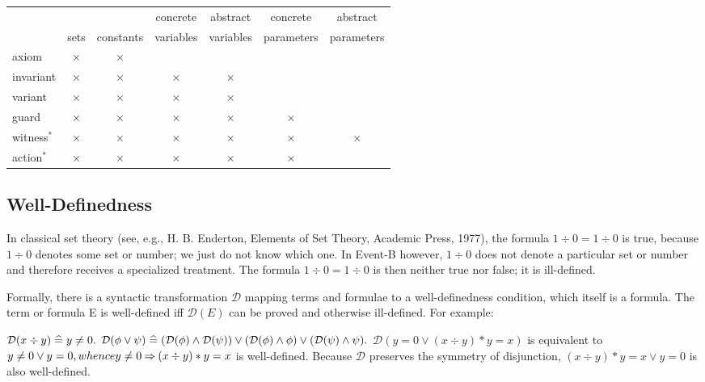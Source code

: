\begin{center}
  \newcommand{\markcell}{$\times$}
  \begin{tabular}{lcccccc}
  \hline
            &           &           & concrete  & abstract  & concrete   & abstract \\
            & sets      & constants & variables & variables & parameters & parameters \\
  \hline
  axiom     & \markcell & \markcell &           &           &            & \\
  invariant & \markcell & \markcell & \markcell & \markcell &            & \\
  variant   & \markcell & \markcell & \markcell & \markcell &            & \\
  guard     & \markcell & \markcell & \markcell & \markcell & \markcell  & \\
  witness$^{*}$   & \markcell & \markcell & \markcell & \markcell & \markcell  & \markcell \\
  action$^{*}$    & \markcell & \markcell & \markcell & \markcell & \markcell  &  \\
  \hline
  \end{tabular}    
\end{center}


\subsection{Well-Definedness}
\label{well_definedness}

In classical set theory (see, e.g., H. B. Enderton, Elements of Set Theory, Academic Press, 1977), the formula $1\div 0 = 1\div 0$ is true, because $1\div 0$ denotes some set or number; we just do not know which one. In Event-B however, $1\div 0$ does not denote a particular set or number and therefore receives a specialized treatment. The formula $1\div 0 = 1\div 0$ is then neither true nor false; it is ill-defined.

Formally, there is a syntactic transformation $\mathcal{D}$ mapping terms and formulae to a well-definedness condition, which itself is a formula. The term or formula E is well-defined iff $\mathcal{D}(E)$ can be proved and otherwise ill-defined. For example:

    $\mathcal{D}(x\div y) \mathrel{\widehat=} y \neq 0.$
    $\mathcal{D}(\phi\lor\psi)\mathrel{\widehat=}(\mathcal{D}(\phi)\land\mathcal{D}(\psi))\lor(\mathcal{D}(\phi)\land\phi)\lor(\mathcal{D}(\psi)\land\psi).$
    $\mathcal{D}(y=0 \lor (x\div y) * y = x)$ is equivalent to $y\neq0 \lor y = 0, whence y\neq0\mathbin\Rightarrow(x\div y)*y=x$ is well-defined.
    Because $\mathcal{D}$ preserves the symmetry of disjunction, $(x\div y)*y=x \lor y = 0$ is also well-defined. 

